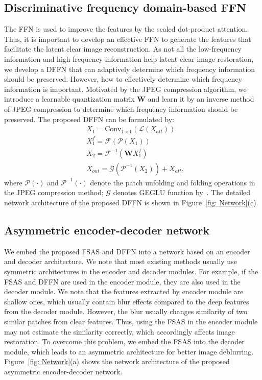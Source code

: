 \documentclass[10pt,twocolumn,letterpaper]{article}
\begin{document}
\subsection{Discriminative frequency domain-based FFN}
The FFN is used to improve the features by the scaled dot-product attention. Thus, it is important to develop an effective FFN to generate the features that facilitate the latent clear image reconstruction.
As not all the low-frequency information and high-frequency information help latent clear image restoration, we develop a DFFN that can adaptively determine which frequency information should be preserved.
However, how to effectively determine which frequency information is important. Motivated by the JPEG compression algorithm, we introduce a learnable quantization matrix $\mathbf{W}$ and learn it by an inverse method of JPEG compression to determine which frequency information should be preserved.
The proposed DFFN can be formulated by:
\begin{equation}
\begin{split}
&X_1 = \mathrm{Conv}_{1\times 1}(\mathcal{L}(X_{att}))\\
&X_1^f = \mathcal{F}(\mathcal{P}(X_1))\\
&X_2 = \mathcal{F}^{-1}(\mathbf{W}X_1^f)\\
&X_{out} = \mathcal{G}\left(\mathcal{P}^{-1}(X_2)\right)+X_{att},
\label{eq: attention_v}
\end{split}
\end{equation}
where $\mathcal{P}(\cdot)$ and $\mathcal{P}^{-1}(\cdot)$ denote the patch unfolding and folding operations in the JPEG compression method; $\mathcal{G}$ denotes GEGLU function by~\cite{GLU}.
The detailed network architecture of the proposed DFFN is shown in Figure~\ref{fig: Network}(c).

\subsection{Asymmetric encoder-decoder network}
\label{section:Asymmetric encoder-decoder network}
We embed the proposed FSAS and DFFN into a network based on an encoder and decoder architecture.
We note that most existing methods usually use symmetric architectures in the encoder and decoder modules.
For example, if the FSAS and DFFN are used in the encoder module, they are also used in the decoder module.
We note that the features extracted by encoder module are shallow ones, which usually contain blur effects compared to the deep features from the decoder module.
However, the blur usually changes similarity of two similar patches from clear features. Thus, using the FSAS in the encoder module may not estimate the similarity correctly, which accordingly affects image restoration.
To overcome this problem, we embed the FSAS into the decoder module, which leads to an asymmetric architecture for better image deblurring.
Figure~\ref{fig: Network}(a) shows the network architecture of the proposed asymmetric encoder-decoder network.
\end{document}
